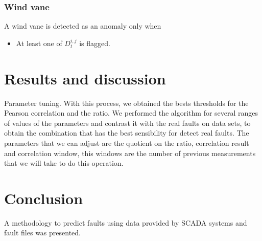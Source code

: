 \documentclass[journal]{IEEEtran}
\begin{document}
\subsubsection{Wind vane}
A wind vane is detected as an anomaly only when 
\begin{itemize}
	\item At least one of $D_t^{i,j}$ is flagged.
\end{itemize}

\section{Results and discussion}\label{sec:results}
Parameter tuning.
With this process, we obtained the bests thresholds for the Pearson correlation and the ratio. We performed the algorithm for several ranges of values of the parameters and contrast it with the real faults on data sets, to obtain the combination that has the best sensibility for detect real faults. The parameters that we can adjust are the quotient on the ratio, correlation result and correlation window, this windows are the number of previous measurements that we will take to do this operation.

\section{Conclusion}\label{sec:conclusion}
A methodology to predict faults using data provided by SCADA systems and fault files was presented. 






\end{document}
